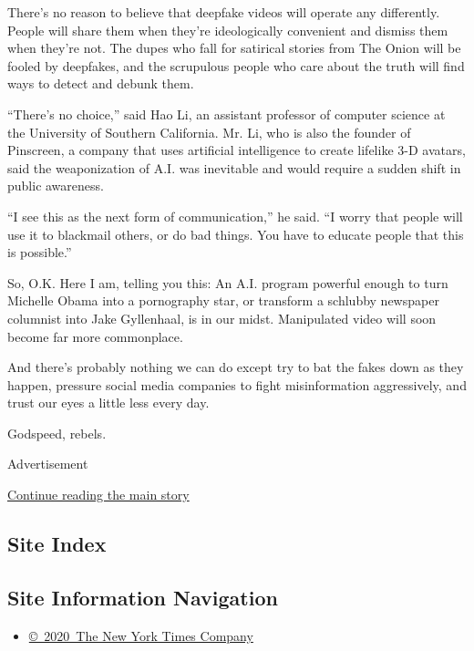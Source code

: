 There's no reason to believe that deepfake videos will operate any
differently. People will share them when they're ideologically
convenient and dismiss them when they're not. The dupes who fall for
satirical stories from The Onion will be fooled by deepfakes, and the
scrupulous people who care about the truth will find ways to detect and
debunk them.

``There's no choice,'' said Hao Li, an assistant professor of computer
science at the University of Southern California. Mr. Li, who is also
the founder of Pinscreen, a company that uses artificial intelligence to
create lifelike 3-D avatars, said the weaponization of A.I. was
inevitable and would require a sudden shift in public awareness.

``I see this as the next form of communication,'' he said. ``I worry
that people will use it to blackmail others, or do bad things. You have
to educate people that this is possible.''

So, O.K. Here I am, telling you this: An A.I. program powerful enough to
turn Michelle Obama into a pornography star, or transform a schlubby
newspaper columnist into Jake Gyllenhaal, is in our midst. Manipulated
video will soon become far more commonplace.

And there's probably nothing we can do except try to bat the fakes down
as they happen, pressure social media companies to fight misinformation
aggressively, and trust our eyes a little less every day.

Godspeed, rebels.

Advertisement

\protect\hyperlink{after-bottom}{Continue reading the main story}

\hypertarget{site-index}{%
\subsection{Site Index}\label{site-index}}

\hypertarget{site-information-navigation}{%
\subsection{Site Information
Navigation}\label{site-information-navigation}}

\begin{itemize}
\tightlist
\item
  \href{https://help.nytimes.com/hc/en-us/articles/115014792127-Copyright-notice}{©~2020~The
  New York Times Company}
\end{itemize}

